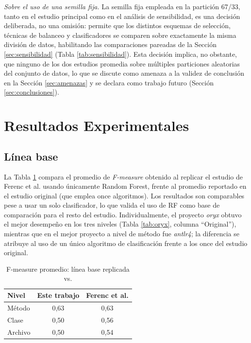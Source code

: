 \documentclass[conference,a4paper]{IEEEtran}
\begin{document}
\textit{Sobre el uso de una semilla fija.} La semilla fija empleada en la partición 67/33, tanto en el estudio principal como en el análisis de sensibilidad, es una decisión deliberada, no una omisión: permite que los distintos esquemas de selección, técnicas de balanceo y clasificadores se comparen sobre exactamente la misma división de datos, habilitando las comparaciones pareadas de la Sección \ref{sec:sensibilidad} (Tabla \ref{tab:sensibilidad}). Esta decisión implica, no obstante, que ninguno de los dos estudios promedia sobre múltiples particiones aleatorias del conjunto de datos, lo que se discute como amenaza a la validez de conclusión en la Sección \ref{sec:amenazas} y se declara como trabajo futuro (Sección \ref{sec:conclusiones}).

\section{Resultados Experimentales}

\subsection{Línea base}
\label{sec:baseline}

La Tabla \ref{tab:baseline} compara el promedio de \textit{F-measure} obtenido al replicar el estudio de Ferenc et al. \cite{ferenc2020} usando únicamente Random Forest, frente al promedio reportado en el estudio original (que emplea once algoritmos). Los resultados son comparables pese a usar un solo clasificador, lo que valida el uso de RF como base de comparación para el resto del estudio. Individualmente, el proyecto \textit{oryx} obtuvo el mejor desempeño en los tres niveles (Tabla \ref{tab:oryx}, columna ``Original''), mientras que en \cite{ferenc2020} el mejor proyecto a nivel de método fue \textit{antlr4}; la diferencia se atribuye al uso de un único algoritmo de clasificación frente a los once del estudio original.

\begin{table}[H]
\caption{F-measure promedio: línea base replicada vs. \cite{ferenc2020}}
\label{tab:baseline}
\centering
\begin{tabular}{lcc}
\toprule
Nivel & Este trabajo & Ferenc et al. \cite{ferenc2020} \\
\midrule
Método  & 0,63 & 0,63 \\
Clase   & 0,50 & 0,56 \\
Archivo & 0,50 & 0,54 \\
\bottomrule
\end{tabular}
\end{table}
\end{document}

